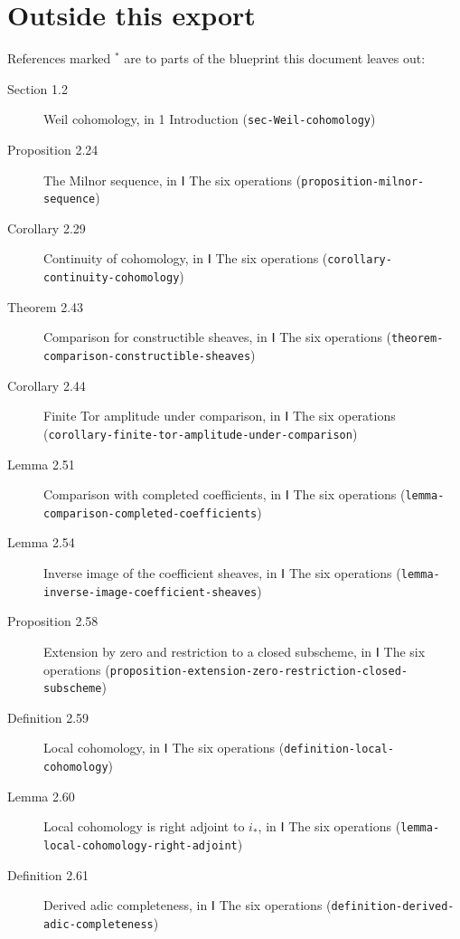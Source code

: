 \documentclass[11pt]{article}
\newcommand{\bpslug}[1]{\texttt{#1}}
\begin{document}
\section*{Outside this export}
References marked \ensuremath{{}^\ast} are to parts of the blueprint this document leaves out:
\begin{description}
\item[Section 1.2] Weil cohomology, in 1 Introduction (\bpslug{sec-{}\allowbreak{}Weil-{}\allowbreak{}cohomology})
\item[Proposition 2.24] The Milnor sequence, in Ⅰ The six operations (\bpslug{proposition-{}\allowbreak{}milnor-{}\allowbreak{}sequence})
\item[Corollary 2.29] Continuity of cohomology, in Ⅰ The six operations (\bpslug{corollary-{}\allowbreak{}continuity-{}\allowbreak{}cohomology})
\item[Theorem 2.43] Comparison for constructible sheaves, in Ⅰ The six operations (\bpslug{theorem-{}\allowbreak{}comparison-{}\allowbreak{}constructible-{}\allowbreak{}sheaves})
\item[Corollary 2.44] Finite Tor amplitude under comparison, in Ⅰ The six operations (\bpslug{corollary-{}\allowbreak{}finite-{}\allowbreak{}tor-{}\allowbreak{}amplitude-{}\allowbreak{}under-{}\allowbreak{}comparison})
\item[Lemma 2.51] Comparison with completed coefficients, in Ⅰ The six operations (\bpslug{lemma-{}\allowbreak{}comparison-{}\allowbreak{}completed-{}\allowbreak{}coefficients})
\item[Lemma 2.54] Inverse image of the coefficient sheaves, in Ⅰ The six operations (\bpslug{lemma-{}\allowbreak{}inverse-{}\allowbreak{}image-{}\allowbreak{}coefficient-{}\allowbreak{}sheaves})
\item[Proposition 2.58] Extension by zero and restriction to a closed subscheme, in Ⅰ The six operations (\bpslug{proposition-{}\allowbreak{}extension-{}\allowbreak{}zero-{}\allowbreak{}restriction-{}\allowbreak{}closed-{}\allowbreak{}subscheme})
\item[Definition 2.59] Local cohomology, in Ⅰ The six operations (\bpslug{definition-{}\allowbreak{}local-{}\allowbreak{}cohomology})
\item[Lemma 2.60] Local cohomology is right adjoint to $i_*$, in Ⅰ The six operations (\bpslug{lemma-{}\allowbreak{}local-{}\allowbreak{}cohomology-{}\allowbreak{}right-{}\allowbreak{}adjoint})
\item[Definition 2.61] Derived adic completeness, in Ⅰ The six operations (\bpslug{definition-{}\allowbreak{}derived-{}\allowbreak{}adic-{}\allowbreak{}completeness})

\end{description}
\end{document}
